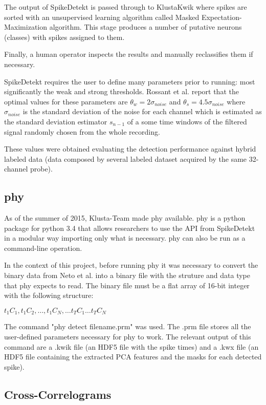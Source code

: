 The output of SpikeDetekt is passed through to KlustaKwik where spikes are sorted with an unsupervised learning algorithm called Masked Expectation-Maximization algorithm. This stage produces a number of putative neurons (classes) with spikes assigned to them.

Finally, a human operator inspects the results and manually reclassifies them if necessary.

SpikeDetekt requires the user to define many parameters prior to running: most significantly the  weak and strong thresholds.  Rossant et al. report that the optimal values for these parameters are $\theta_w = 2 \sigma_{noise}$ and $\theta_s = 4.5 \sigma_{noise}$ where $\sigma_{noise}$ is the standard deviation of the noise for each channel which is estimated as the standard deviation estimator $s_{n-1}$ of a some time windows of the filtered signal randomly chosen from the whole recording.

These values were obtained evaluating the detection performance against hybrid labeled data (data composed by several labeled dataset acquired by the same 32-channel probe). 

\subsection{phy}
\label{subsec:phy}
As of the summer of 2015, Klusta-Team made phy available. phy is a python package for python 3.4 that allows researchers to use the API from SpikeDetekt in a modular way importing only what is necessary. phy can also be run as a command-line operation.

In the context of this project, before running phy it was necessary to convert the binary data from Neto et al. into a binary file with the struture and data type that phy expects to read. The binary file must be a flat array of 16-bit integer with the following structure:

$t_1C_1 , t_1C_2, \ldots , t_1C_N, \ldots t_TC_1 \ldots t_TC_N$ %

The command "phy detect filename.prm" was used. The .prm file stores all the user-defined parameters necessary for phy to work. The relevant output of this command are a .kwik file (an HDF5 file with the spike times) and a .kwx file (an HDF5 file containing the extracted PCA features and the masks for each detected spike).

\subsection{Cross-Correlograms}
\label{subsec:CC}

